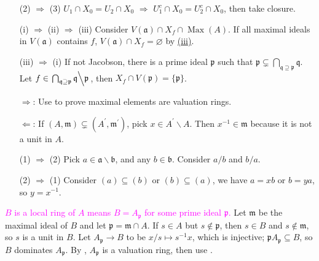 \begin{exercise}\label{ex5.26}
	\begin{enumerate}
		\item[(2) $\Rightarrow$ (3)] $U_1\cap X_0=U_2\cap X_0$ $\Rightarrow$ $U_1^c\cap X_0=U_2^c\cap X_0$, then take closure.
		\item[(i) $\Rightarrow$ (ii) $\Rightarrow$ (iii)] Consider $V(\mathfrak{a})\cap X_f\cap\operatorname{Max}(A)$. If all maximal ideals in $V(\mathfrak{a})$ contains $f$, $V(\mathfrak{a})\cap X_f=\varnothing$ by \hyperref[ex5.23]{(iii)}.
		\item[(iii) $\Rightarrow$ (i)] If not Jacobson, there is a prime ideal $\mathfrak{p}$ such that $\mathfrak{p}\subsetneq\bigcap_{\mathfrak{q}\supseteq\mathfrak{p}}\mathfrak{q}$. Let $f\in\left.\bigcap_{\mathfrak{q}\supseteq\mathfrak{p}}\mathfrak{q}\middle\backslash\mathfrak{p}\right.$, then $X_f\cap V(\mathfrak{p})=\{\mathfrak{p}\}$.
	\end{enumerate}
\end{exercise}

\begin{exercise}\label{ex5.27}
	\begin{enumerate}
		\item[$\Rightarrow$:] Use  to prove maximal elements are valuation rings.
		\item[$\Leftarrow$:] If $(A,\mathfrak{m})\subsetneq(A^\prime,\mathfrak{m}^\prime)$, pick $x\in A^\prime\backslash A$. Then $x^{-1}\in\mathfrak{m}$ because it is not a unit in $A$.
	\end{enumerate}
\end{exercise}

\begin{exercise}\label{ex5.28}
	\begin{enumerate}
		\item[(1) $\Rightarrow$ (2)] Pick $a\in\mathfrak{a}\backslash\mathfrak{b}$, and any $b\in\mathfrak{b}$. Consider $a/b$ and $b/a$.
		\item[(2) $\Rightarrow$ (1)] Consider $(a)\subseteq(b)$ or $(b)\subseteq(a)$, we have $a=xb$ or $b=ya$, so $y=x^{-1}$.
	\end{enumerate}
\end{exercise}

\begin{exercise}\label{ex5.29}
	\textcolor{magenta}{$B$ is a local ring of $A$ means $B=A_\mathfrak{p}$ for some prime ideal $\mathfrak{p}$.} Let $\mathfrak{m}$ be the maximal ideal of $B$ and let $\mathfrak{p}=\mathfrak{m}\cap A$. If $s\in A$ but $s\notin\mathfrak{p}$, then $s\in B$ and $s\notin\mathfrak{m}$, so $s$ is a unit in $B$. Let $A_\mathfrak{p}\rightarrow B$ to be $x/s\mapsto s^{-1}x$, which is injective; $\mathfrak{p}A_\mathfrak{p}\subseteq B$, so $B$ dominates $A_\mathfrak{p}$. By , $A_\mathfrak{p}$ is a valuation ring, then use .
\end{exercise}

